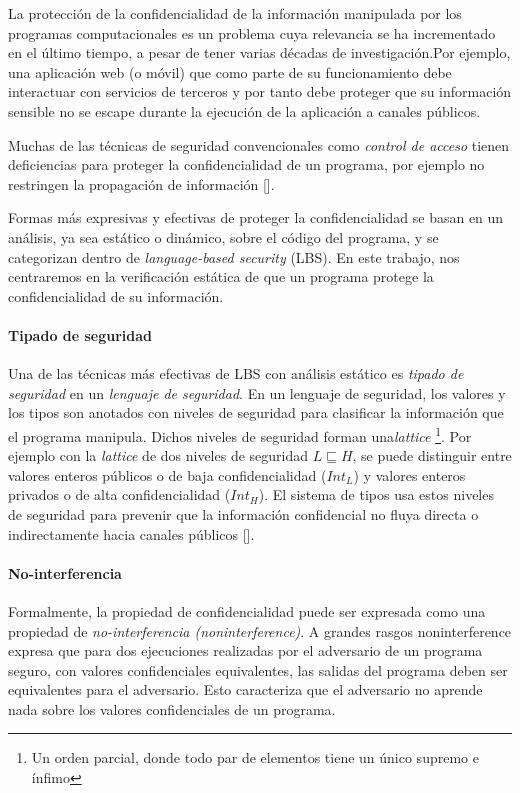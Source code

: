 \begin{intro}
		La protección de la confidencialidad de la información manipulada por los programas computacionales es un problema cuya relevancia se ha incrementado en el último tiempo, a pesar de tener varias décadas de investigación.Por ejemplo, una aplicación web (o móvil) que como parte de su funcionamiento debe interactuar con servicios de terceros y por tanto debe proteger que su información sensible no se escape durante la ejecución de la aplicación a canales públicos.

		Muchas de las técnicas de seguridad convencionales como \textit{control de acceso} tienen deficiencias para proteger la confidencialidad de un programa, por ejemplo no restringen la propagación de información []. %

		Formas más expresivas y efectivas de proteger la confidencialidad se basan en un análisis, ya sea estático o dinámico, sobre el código del programa, y se categorizan dentro de \textit{language-based security} (LBS). En este trabajo, nos centraremos en la verificación estática de que un programa protege la confidencialidad de su información.

		\paragraph{Tipado de seguridad}
		Una de las técnicas más efectivas de LBS con análisis estático es \textit{tipado de seguridad} en un \textit{lenguaje de seguridad}. En un lenguaje de seguridad, los valores y los tipos son anotados con niveles de seguridad para clasificar la información que el programa manipula. Dichos niveles de seguridad forman una\textit{lattice} \footnote{Un orden parcial, donde todo par de elementos tiene un único supremo e ínfimo}. Por ejemplo con la \textit{lattice} de dos niveles de seguridad $L \sqsubseteq H$, se puede distinguir entre valores enteros públicos o de baja confidencialidad ($Int_L$) y valores enteros privados o de alta confidencialidad ($Int_H$). El sistema de tipos usa estos niveles de seguridad para prevenir que la información confidencial no fluya directa o indirectamente hacia canales públicos []. %

		\paragraph{No-interferencia}
		Formalmente, la propiedad de confidencialidad puede ser expresada como una propiedad de \textit{no-interferencia (noninterference)}. A grandes rasgos noninterference expresa que para dos ejecuciones realizadas por el adversario de un programa seguro, con valores confidenciales equivalentes, las salidas del programa deben ser equivalentes para el adversario. Esto caracteriza que el adversario no aprende nada sobre los valores confidenciales de un programa.


\end{intro}
